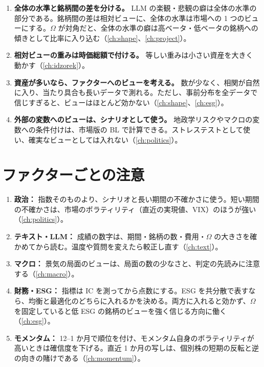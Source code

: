 \begin{enumerate}[label=\textbf{\arabic*.},leftmargin=2.2em,resume]
\item \textbf{全体の水準と銘柄間の差を分ける。} LLM の楽観・悲観の癖は全体の水準の部分である。銘柄間の差は相対ビューに、全体の水準は市場への 1 つのビューにする。$\Omega$ が対角だと、全体の水準の癖は高ベータ・低ベータの銘柄への傾きとして比率に入り込む（\ref{ch:shape}、\ref{ch:project}）。
\item \textbf{相対ビューの重みは時価総額で付ける。} 等しい重みは小さい資産を大きく動かす（\ref{ch:idzorek}）。
\item \textbf{資産が多いなら、ファクターへのビューを考える。} 数が少なく、相関が自然に入り、当たり具合も長いデータで測れる。ただし、事前分布を全データで信じすぎると、ビューはほとんど効かない（\ref{ch:shape}、\ref{ch:esg}）。
\item \textbf{外部の変数へのビューは、シナリオとして使う。} 地政学リスクやマクロの変数への条件付けは、市場版の BL で計算できる。ストレステストとして使い、確実なビューとしては入れない（\ref{ch:politics}）。
\end{enumerate}

\section{ファクターごとの注意}

\begin{enumerate}[label=\textbf{\arabic*.},leftmargin=2.2em,resume]
\item \textbf{政治：} 指数そのものより、シナリオと長い期間の不確かさに使う。短い期間の不確かさは、市場のボラティリティ（直近の実現値、VIX）のほうが強い（\ref{ch:politics}）。
\item \textbf{テキスト・LLM：} 成績の数字は、期間・銘柄の数・費用・$\Omega$ の大きさを確かめてから読む。温度や質問を変えたら較正し直す（\ref{ch:text}）。
\item \textbf{マクロ：} 景気の局面のビューは、局面の数の少なさと、判定の先読みに注意する（\ref{ch:macro}）。
\item \textbf{財務・ESG：} 指標は IC を測ってから点数にする。ESG を共分散で表すなら、均衡と最適化のどちらに入れるかを決める。両方に入れると効かず、$\Omega$ を固定していると低 ESG の銘柄のビューを強く信じる方向に働く（\ref{ch:esg}）。
\item \textbf{モメンタム：} 12--1 か月で順位を付け、モメンタム自身のボラティリティが高いときは確信度を下げる。直近 1 か月の写しは、個別株の短期の反転と逆の向きの賭けである（\ref{ch:momentum}）。
\end{enumerate}

